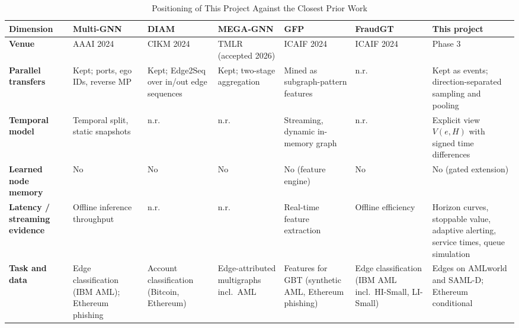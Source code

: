 \documentclass[11pt,a4paper]{article}
\begin{document}
\begin{table}[htbp]
\centering
\scriptsize
\caption{Positioning of This Project Against the Closest Prior Work}
\label{tab:prior_work_positioning}
\begin{tabularx}{\textwidth}{L{2.3cm} L{1.85cm} L{1.85cm} L{1.85cm} L{1.85cm} L{1.6cm} X}
\toprule
\textbf{Dimension} & \textbf{Multi-GNN \cite{egressy2024multigraph}} & \textbf{DIAM \cite{ding2024diam}} & \textbf{MEGA-GNN \cite{bilgi2026mega}} & \textbf{GFP \cite{blanusa2024gfp}} & \textbf{FraudGT \cite{lin2024fraudgt}} & \textbf{This project} \\
\midrule
\textbf{Venue} & AAAI 2024 & CIKM 2024 & TMLR (accepted 2026) & ICAIF 2024 & ICAIF 2024 & Phase 3 \\
\midrule
\textbf{Parallel transfers} & Kept; ports, ego IDs, reverse MP & Kept; Edge2Seq over in/out edge sequences & Kept; two-stage aggregation & Mined as subgraph-pattern features & n.r. & Kept as events; direction-separated sampling and pooling \\
\midrule
\textbf{Temporal model} & Temporal split, static snapshots & n.r. & n.r. & Streaming, dynamic in-memory graph & n.r. & Explicit view $V(e,H)$ with signed time differences \\
\midrule
\textbf{Learned node memory} & No & No & No & No (feature engine) & No & No (gated extension) \\
\midrule
\textbf{Latency / streaming evidence} & Offline inference throughput & n.r. & n.r. & Real-time feature extraction & Offline efficiency & Horizon curves, stoppable value, adaptive alerting, service times, queue simulation \\
\midrule
\textbf{Task and data} & Edge classification (IBM AML); Ethereum phishing & Account classification (Bitcoin, Ethereum) & Edge-attributed multigraphs incl.\ AML & Features for GBT (synthetic AML, Ethereum phishing) & Edge classification (IBM AML incl.\ HI-Small, LI-Small) & Edges on AMLworld and SAML-D; Ethereum conditional \\
\bottomrule
\end{tabularx}
\end{table}
\end{document}
